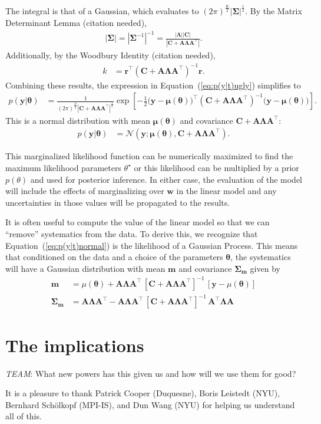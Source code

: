 \documentclass[modern]{rnaastex}
\renewcommand{\eqref}[1]{\ref{eq:#1}}
\newcommand{\Eq}[1]{Equation~(\eqref{#1})}
\newcommand{\eq}[1]{\Eq{#1}}
\newcommand{\eqlabel}[1]{\label{eq:#1}}
\newcommand{\todo}[3]{{\color{#2}\emph{#1}: #3}}
\newcommand{\alltodo}[1]{\todo{TEAM}{red}{#1}}
\newcommand{\citeme}{{\color{red}(citation needed)}}
\newcommand{\bvec}[1]{{\ensuremath{\boldsymbol{#1}}}}
\newcommand{\Normal}{\ensuremath{\mathcal{N}}}
\newcommand{\mA}{\ensuremath{\bvec{A}}}
\newcommand{\mC}{\ensuremath{\bvec{C}}}
\newcommand{\mS}{\ensuremath{\bvec{\Sigma}}}
\newcommand{\mL}{\ensuremath{\bvec{\Lambda}}}
\newcommand{\vy}{\ensuremath{\bvec{y}}}
\newcommand{\vt}{\ensuremath{\bvec{\theta}}}
\newcommand{\vm}{\ensuremath{\bvec{\mu}(\bvec{\theta})}}
\newcommand{\vre}{\ensuremath{\bvec{r}}}
\begin{document}
%
The integral is that of a Gaussian, which evaluates to
$(2\pi)^\frac{K}{2}|\bvec{\Sigma}|^\frac{1}{2}$.
By the Matrix Determinant Lemma \citeme,
%
\begin{align}
|\mS| = {|\mS^{-1}|}^{-1} = \frac{|\mL| |\mC|}{|\mC + \mA \mL \mA^\top|}.
\end{align}
%
Additionally, by the Woodbury Identity \citeme,
%
\begin{align}
k &= \vre^\top \left( \mC + \mA \mL \mA^\top \right)^{-1} \vre.
\end{align}
%
Combining these results, the expression in \eq{p(y|t)ugly} simplifies to
\begin{align}
\eqlabel{p(y|t)exp}
p(\vy | \vt) &= \frac{1}{(2 \pi)^\frac{N}{2}
                |\mC + \mA \mL \mA^\top|^\frac{1}{2}}
                \exp \left[ -\frac{1}{2} \big( \vy - \vm \big)^\top
                            (\mC + \mA \mL \mA^\top)^{-1}
                            \big( \vy - \vm \big)
                     \right].
\end{align}
%
This is a normal distribution with mean $\vm$ and covariance
$\mC + \mA \mL \mA^\top$:
%
\begin{align}
\eqlabel{p(y|t)normal}
p(\vy | \vt) &= \Normal (\vy; \vm, \mC + \mA \mL \mA^\top).
\end{align}

This marginalized likelihood function can be numerically maximized to find the
maximum likelihood parameters $\theta^\star$ or this likelihood can be
multiplied by a prior $p(\theta)$ and used for posterior inference.
In either case, the evaluation of the model will include the effects of
marginalizing over $\bvec{w}$ in the linear model and any uncertainties in
those values will be propagated to the results.

It is often useful to compute the value of the linear model so that we can
``remove'' systematics from the data.
To derive this, we recognize that \eq{p(y|t)normal} is the likelihood of a
Gaussian Process.
This means that conditioned on the data and a choice of the parameters
$\bvec{\theta}$, the systematics will have a Gaussian distribution with mean
$\bvec{m}$ and covariance $\bvec{\Sigma}_\bvec{m}$ given by
\citep{Rasmussen:2006}
%
\begin{align}
\bvec{m} &= \mu(\bvec{\theta}) + \mA \mL \mA^\top\, \left[\mC + \mA \mL
    \mA^\top\right]^{-1}\,\left[\bvec{y} - \mu(\bvec{\theta})\right]
    \nonumber\\
\bvec{\Sigma}_\bvec{m} &= \mA \mL \mA^\top - \mA \mL \mA^\top\,
    \left[\mC + \mA \mL \mA^\top\right]^{-1} \,
    \mA^\top \mL \mA
\end{align}

\section{The implications}

\alltodo{What new powers has this given us and how will we use them for good?}

\acknowledgements
It is a pleasure to thank
  Patrick Cooper (Duquesne),
  Boris Leistedt (NYU),
  Bernhard Sch\"olkopf (MPI-IS), and
  Dun Wang (NYU)
for helping us understand all of this.


\end{document}
